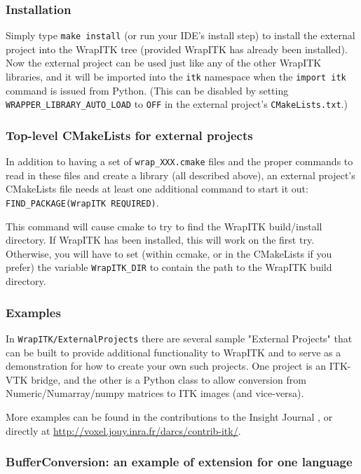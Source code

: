 \documentclass{InsightArticle}
\begin{document}
    \subsubsection{Installation}
Simply type \verb$make install$ (or run your IDE's install step) to install the
external project into the WrapITK tree (provided WrapITK has already been
installed). Now the external project can be used just like any of the other
WrapITK libraries, and it will be imported into the \verb$itk$ namespace when the
\verb$import itk$ command is issued from Python. (This can be disabled by setting
\verb$WRAPPER_LIBRARY_AUTO_LOAD$ to \verb$OFF$ in the external project's \verb$CMakeLists.txt$.)

    \subsubsection{Top-level CMakeLists for external projects}
In addition to having a set of \verb$wrap_XXX.cmake$ files and the proper
commands to read in these files and create a library (all described above), an
external project's CMakeLists file needs at least one additional command to
start it out: \verb$FIND_PACKAGE(WrapITK REQUIRED)$.

This command will cause cmake to try to find the WrapITK build/install
directory. If WrapITK has been installed, this will work on the first try.
Otherwise, you will have to set (within ccmake, or in the CMakeLists if you
prefer) the variable \verb$WrapITK_DIR$ to contain the path to the WrapITK build
directory.

    \subsubsection{Examples}

In \verb$WrapITK/ExternalProjects$ there are several sample "External Projects" that
can be built to provide additional functionality to WrapITK and to serve as a
demonstration for how to create your own such projects. One project is an
ITK-VTK \cite{VtkWebSite} bridge, and the other is a Python class to allow conversion from
Numeric/Numarray/numpy \cite{NumericWebSite,NumarrayWebSite,NumpyWebSite} matrices to
ITK images (and vice-versa).

More examples can be found in the contributions to the Insight Journal
\cite{InsightJournalWebSite}, or directly at \url{http://voxel.jouy.inra.fr/darcs/contrib-itk/}.

    \subsubsection{BufferConversion: an example of extension for one language}
\end{document}

